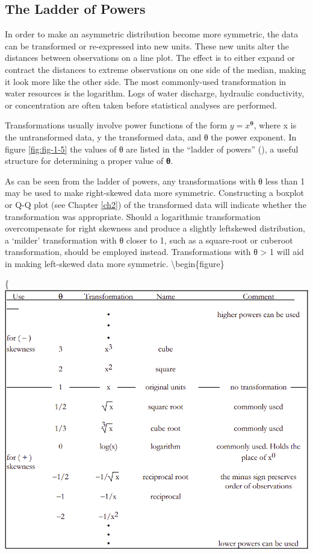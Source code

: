 \documentclass[]{book}
\begin{document}
\hypertarget{the-ladder-of-powers}{%
\subsection{The Ladder of Powers}\label{the-ladder-of-powers}}

In order to make an asymmetric distribution become more symmetric, the data can be transformed or re-expressed into new units. These new units alter the distances between observations on a line plot. The effect is to either expand or contract the distances to extreme observations on one side of the median, making it look more like the other side. The most commonly-used transformation in water resources is the logarithm. Logs of water discharge, hydraulic conductivity, or concentration are often taken before statistical analyses are performed.

Transformations usually involve power functions of the form \(y = x^{\mathbf{θ}}\), where x is the untransformed data, y the transformed data, and θ the power exponent. In figure \ref{fig:fig-1-5} the values of θ are listed in the ``ladder of powers'' (\citet{velleman_applications_1981}), a useful structure for determining a proper value of \textbf{θ}.

As can be seen from the ladder of powers, any transformations with θ less than 1 may be used to make right-skewed data more symmetric. Constructing a boxplot or Q-Q plot (see Chapter \ref{ch2}) of the transformed data will indicate whether the transformation was appropriate. Should a logarithmic transformation overcompensate for right skewness and produce a slightly leftskewed distribution, a `milder' transformation with θ closer to 1, such as a square-root or cuberoot transformation, should be employed instead. Transformations with θ \textgreater{} 1 will aid in making left-skewed data more symmetric.
\textbackslash{}begin\{figure\}

\{\centering \includegraphics[width=12.65in]{figures/1_5}
\end{document}
